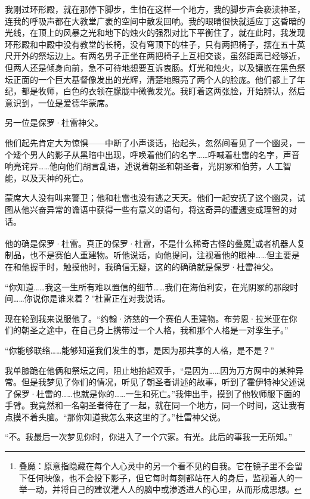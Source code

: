 \documentclass[AutoFakeBold=true]{book}
\begin{document}
我刚过环形殿，就在那停下脚步，生怕在这样一个地方，我的脚步声会亵渎神圣，连我的呼吸声都在大教堂广袤的空间中散发回响。我的眼睛很快就适应丁这昏暗的光线，在顶上的风暴之光和地下的烛火的强烈对比下平衡住了，就在此时，我发现环形殿和中殿中没有教堂的长椅，没有穹顶下的柱子，只有两把椅子，摆在五十英尺开外的祭坛边上。有两名男子正坐在两把椅子上互相交谈，虽然距离已经够近，但两人还是倾身向前，急不可待地想要互诉衷肠。灯光和烛火，以及镶嵌在黑色祭坛正面的一个巨大基督像发出的光辉，清楚地照亮了两个人的脸庞。他们都上了年纪，都是牧师，白色的衣领在朦胧中微微发光。我盯着这两张脸，开始辨认，然后意识到，一位是爱德华蒙席。

另一位是保罗·杜雷神父。

\vspace*{1em}

他们起先肯定大为惊惧——中断了小声谈话，抬起头，忽然间看见了一个幽灵，一个矮个男人的影子从黑暗中出现，呼唤着他们的名字……呼喊着杜雷的名字，声音响亮诧异……他向他们胡言乱语，述说着朝圣和朝圣者，光阴冢和伯劳，人工智能，以及天神的死亡。

蒙席大人没有叫来警卫；他和杜雷也没有逃之天天。他们一起安抚了这个幽灵，试图从他兴奋异常的谵语中获得一些有意义的语句，将这奇异的遭遇变成理智的对话。

他的确是保罗·杜雷。真正的保罗·杜雷，不是什么稀奇古怪的叠魔\footnote{叠魔：原意指隐藏在每个人心灵中的另一个看不见的自我。它在镜子里不会留下任何映像，也不会投下影子，但它每时每刻都站在人的身后，监视着人的一举一动，并将自己的建议灌人人的脑中或渗透进人的心里，从而形成思想。}或者机器人复制品，也不是赛伯人重建物。听他说话，向他提问，注视着他的眼神……但主要是在和他握手时，触摸他时，我确信无疑，这的的确确就是保罗·杜雷神父。

``你知道……我这一生所有难以置信的细节……我们在海伯利安，在光阴冢的那段时间……你说你是谁来着？''杜雷正在对我说话。

现在轮到我来说服他了。``约翰·济慈的一个赛伯人重建物。布劳恩·拉米亚在你们的朝圣之途中，在自己身上携带过一个人格，我和那个人格是一对孪生子。''

``你能够联络……能够知道我们发生的事，是因为那共享的人格，是不是？''

我单膝跪在他俩和祭坛之间，阻止地抬起双手，``是因为……因为万方网中的某种异常。但是我梦见了你们的情况，听见了朝圣者讲述的故事，听到了霍伊特神父述说了保罗·杜雷的……也就是你的……一生和死亡。''我伸出手，摸到了他牧师服下面的手臂。我竟然和一名朝圣者待在了一起，就在同一个地方，同一个时间，这让我有点摸不着头脑。``那你知道我怎么来这里的了。''杜雷神父说。

``不。我最后一次梦见你时，你进入了一个穴冢。有光。此后的事我一无所知。''
\end{document}
